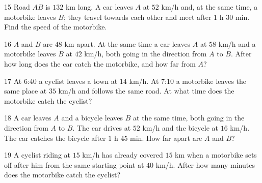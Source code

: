 \gap
\begin{probbox}{15}{\relax}
Road $AB$ is $132$ km long. A car leaves $A$ at $52$ km/h and, at the same time, a motorbike leaves $B$; they travel towards each other and meet after $1$ h $30$ min. Find the speed of the motorbike.
\end{probbox}
\gap
\begin{probbox}{16}{\relax}
$A$ and $B$ are $48$ km apart. At the same time a car leaves $A$ at $58$ km/h and a motorbike leaves $B$ at $42$ km/h, both going in the direction from $A$ to $B$. After how long does the car catch the motorbike, and how far from $A$?
\end{probbox}
\gap
\begin{probbox}{17}{\relax}
At 6:40 a cyclist leaves a town at $14$ km/h. At 7:10 a motorbike leaves the same place at $35$ km/h and follows the same road. At what time does the motorbike catch the cyclist?
\end{probbox}
\gap
\begin{probbox}{18}{\relax}
A car leaves $A$ and a bicycle leaves $B$ at the same time, both going in the direction from $A$ to $B$. The car drives at $52$ km/h and the bicycle at $16$ km/h. The car catches the bicycle after $1$ h $45$ min. How far apart are $A$ and $B$?
\end{probbox}
\gap
\begin{probbox}{19}{\relax}
A cyclist riding at $15$ km/h has already covered $15$ km when a motorbike sets off after him from the same starting point at $40$ km/h. After how many minutes does the motorbike catch the cyclist?
\end{probbox}
